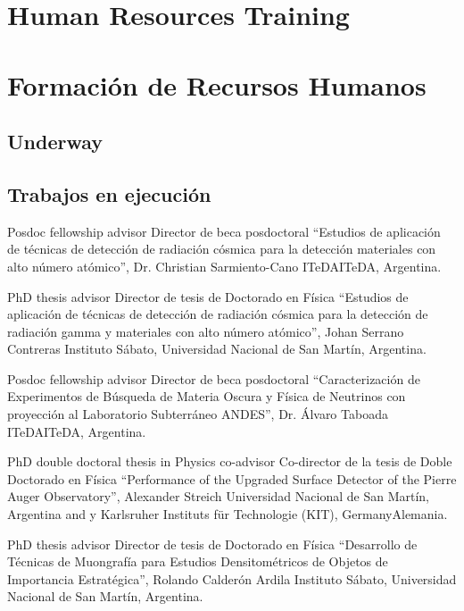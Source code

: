 \ifeng
\section*{Human Resources Training}
\else
\section*{Formación de Recursos Humanos}
\fi

\ifeng
	\subsection*{Underway}
\else
	\subsection*{Trabajos en ejecución}
\fi

\ifeng
Posdoc fellowship advisor
\else
Director de beca posdoctoral
\fi
``Estudios de aplicación de técnicas de detección de radiación cósmica para la detección materiales con alto número atómico'', Dr. Christian Sarmiento-Cano \at \ifeng ITeDA\else ITeDA\fi, Argentina.

\ifeng
PhD thesis advisor
 \else
Director de tesis de Doctorado en Física
 \fi
``Estudios de aplicación de técnicas de detección de radiación cósmica para la detección de radiación gamma y materiales con alto número atómico'', Johan Serrano Contreras \at Instituto Sábato, Universidad Nacional de San Martín, Argentina.

\ifeng
Posdoc fellowship advisor
\else
Director de beca posdoctoral
\fi
``Caracterización de Experimentos de Búsqueda de Materia Oscura y Física de Neutrinos con proyección al Laboratorio Subterráneo ANDES'', Dr. Álvaro Taboada \at \ifeng ITeDA\else ITeDA\fi, Argentina.

\ifeng
PhD double doctoral thesis in Physics co-advisor
\else
Co-director de la tesis de Doble Doctorado en Física
\fi
``Performance of the Upgraded Surface Detector of the Pierre Auger Observatory'', Alexander Streich \at Universidad Nacional de San Martín, Argentina \ifeng and \else y \fi Karlsruher Instituts für Technologie (KIT), \ifeng Germany\else Alemania\fi.

\ifeng
PhD thesis advisor
 \else
Director de tesis de Doctorado en Física
 \fi
``Desarrollo de Técnicas de Muongrafía para Estudios Densitométricos de Objetos de Importancia Estratégica'', Rolando Calderón Ardila \at Instituto Sábato, Universidad Nacional de San Martín, Argentina.


